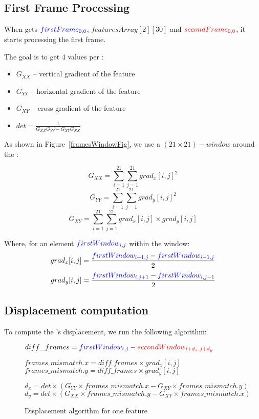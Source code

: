 \subsection{First Frame Processing}\label{gradientProcessing}

When \vc{} gets $\textcolor{blue}{firstFrame_{0,0}}$,  $featuresArray[2][30]$ and $\textcolor{red}{secondFrame_{0,0}}$, it starts processing the first frame.

The goal is to get 4 values per \feat{}:
\begin{itemize}
	\item $G_{XX}$ -- vertical gradient of the feature
	\item $G_{YY}$ -- horizontal gradient of the feature
	\item $G_{XY}$ -- cross gradient of the feature
	\item $det = \frac{1}{G_{XX}G_{YY}-G_{XY}G_{XX}}$
\end{itemize}

As shown in Figure~\ref{framesWindowFig}, we use a $(21\times21)-window$ around the \feat{}:

$$G_{XX} = \sum_{i=1}^{21}\sum_{j=1}^{21} grad_{x}[i,j]^{2}$$
$$G_{YY} = \sum_{i=1}^{21}\sum_{j=1}^{21} grad_{y}[i,j]^{2}$$
$$G_{XY} = \sum_{i=1}^{21}\sum_{j=1}^{21} grad_{x}[i,j]\times grad_{y}[i,j]$$

Where, for an element $\textcolor{blue}{firstWindow_{i,j}}$ within the window:
$$grad_{x}[i,j] = \frac{\textcolor{blue}{firstWindow_{i+1,j}} - \textcolor{blue}{firstWindow_{i-1,j}}}{2}$$
$$grad_{y}[i,j] = \frac{\textcolor{blue}{firstWindow_{i,j+1}} - \textcolor{blue}{firstWindow_{i,j-1}}}{2}$$
\newpage


\subsection{Displacement computation}\label{dispComp}

To compute the \feat{}'s displacement, we run the following algorithm:

\begin{figure}[!htbp]
\begin{algorithmic}

	\State $diff\_frames = \textcolor{blue}{firstWindow_{i,j}} - \textcolor{red}{secondWindow_{i+d_{x},j+d_{y}}}$

	\State $frames\_mismatch.x = diff\_frames\times grad_{x}[i,j]$
	\State $frames\_mismatch.y = diff\_frames\times grad_{y}[i,j]$

	\EndFor

	\State $d_{x} = det\times (G_{YY}\times frames\_mismatch.x - G_{XY}\times frames\_mismatch.y)$
	\State $d_{y} = det\times (G_{XX}\times frames\_mismatch.y - G_{XY}\times frames\_mismatch.x)$
\end{algorithmic}
\caption{Displacement algorithm for one feature}
\label{algoFig}
\end{figure}
\FloatBarrier

